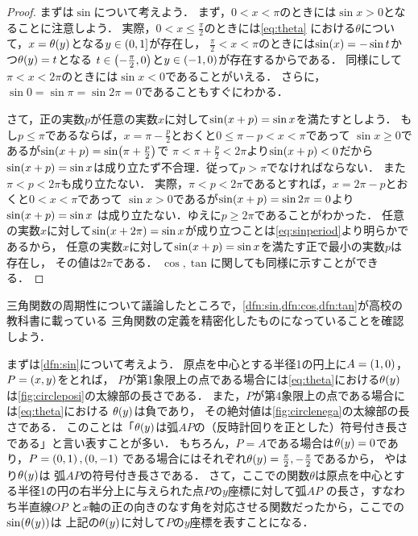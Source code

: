 \documentclass[11pt,a4paper]{ltjsarticle}
\newcommand*{\coord}[1]{\paren{#1}}
\theoremstyle{definition}
\begin{document}
\begin{proof}
  まずは$\sin$について考えよう．
  まず，$0 < x < \pi$のときには$\sin x > 0$となることに注意しよう．
  実際，$0 < x \leq \frac{\pi}{2}$のときには\cref{eq:theta}
  における$\theta$について，$x = \apply{\theta}{y}$となる$y \in \interval{lop}{0,1}$が存在し，
  $\frac{\pi}{2} < x < \pi$のときには$\apply{\sin}{x} = - \sin t$かつ$\apply{\theta}{y} = t$となる
  $t \in \interval{op}{- \frac{\pi}{2}, 0}$と$y \in \interval{op}{-1, 0}$が存在するからである．
  同様にして$\pi < x < 2 \pi$のときには$\sin x < 0$であることがいえる．
  さらに，$\sin 0 = \sin \pi = \sin 2 \pi = 0$であることもすぐにわかる．
  
  さて，正の実数$p$が任意の実数$x$に対して$\apply{\sin}{x + p} = \sin x$を満たすとしよう．
  もし$p \leq \pi$であるならば，$x = \pi - \frac{p}{2}$とおくと$0 \leq \pi - p < x < \pi$であって
  $\sin x \geq 0$であるが$\apply{\sin}{x + p} = \apply{\sin}{\pi + \frac{p}{2}}$で
  $\pi < \pi + \frac{p}{2} < 2 \pi$より$\apply{\sin}{x + p} < 0$だから
  $\apply{\sin}{x + p} = \sin x$は成り立たず不合理．従って$p > \pi$でなければならない．
  また$\pi < p < 2 \pi$も成り立たない．
  実際，$\pi < p < 2 \pi$であるとすれば，$x = 2 \pi - p$とおくと$0 < x < \pi$であって
  $\sin x > 0$であるが$\apply{\sin}{x + p} = \sin 2 \pi = 0$より$\apply{\sin}{x + p} = \sin x$
  は成り立たない．ゆえに$p \geq 2 \pi$であることがわかった．
  任意の実数$x$に対して$\apply{\sin}{x + 2 \pi} = \sin x$が成り立つことは\cref{eq:sinperiod}より明らかであるから，
  任意の実数$x$に対して$\apply{\sin}{x + p} = \sin x$を満たす正で最小の実数$p$は存在し，
  その値は$2 \pi$である．
  $\cos, \tan$に関しても同様に示すことができる．
\end{proof}

三角関数の周期性について議論したところで，\cref{dfn:sin,dfn:cos,dfn:tan}が高校の教科書に載っている
三角関数の定義を精密化したものになっていることを確認しよう．

まずは\cref{dfn:sin}について考えよう．
原点を中心とする半径1の円上に$A = \coord{1,0}$，$P = \coord{x,y}$をとれば，
$P$が第1象限上の点である場合には\cref{eq:theta}における$\apply{\theta}{y}$
は\cref{fig:circleposi}の太線部の長さである．
また，$P$が第4象限上の点である場合には\cref{eq:theta}における
$\apply{\theta}{y}$は負であり，
その絶対値は\cref{fig:circlenega}の太線部の長さである．
このことは「$\apply{\theta}{y}$は弧$AP$の（反時計回りを正とした）符号付き長さである」と言い表すことが多い．
もちろん，$P = A$である場合は$\apply{\theta}{y} = 0$であり，$P = \coord{0, 1}, \coord{0, -1}$
である場合にはそれぞれ$\apply{\theta}{y} = \frac{\pi}{2}, - \frac{\pi}{2}$であるから，
やはり$\apply{\theta}{y}$は
弧$AP$の符号付き長さである．
さて，ここでの関数$\theta$は原点を中心とする半径1の円の右半分上に与えられた点$P$の$y$座標に対して弧$AP$
の長さ，すなわち半直線$OP$
と$x$軸の正の向きのなす角を対応させる関数だったから，ここでの$\apply{\sin}{\apply{\theta}{y}}$は
上記の$\apply{\theta}{y}$に対して$P$の$y$座標を表すことになる．
\end{document}
